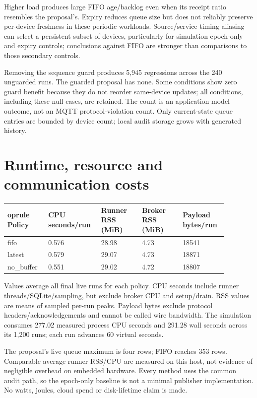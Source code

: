 \documentclass[11pt,a4paper]{article}
\begin{document}
Higher load produces large FIFO age/backlog even when its receipt ratio resembles the proposal's. Expiry reduces queue size but does not reliably preserve per-device freshness in these periodic workloads. Source/service timing aliasing can select a persistent subset of devices, particularly for simulation epoch-only and expiry controls; conclusions against FIFO are stronger than comparisons to those secondary controls.


Removing the sequence guard produces 5,945 regressions across the 240 unguarded runs. The guarded proposal has none. Some conditions show zero guard benefit because they do not reorder same-device updates; all conditions, including these null cases, are retained. The count is an application-model outcome, not an MQTT protocol-violation count. Only current-state queue entries are bounded by device count; local audit storage grows with generated history.


\section{Runtime, resource and communication costs}

\begingroup\small\setlength{\tabcolsep}{3pt}\begin{longtable}{p{0.176\linewidth}p{0.176\linewidth}p{0.176\linewidth}p{0.176\linewidth}p{0.176\linewidth}}	oprule
Policy & CPU seconds/run & Runner RSS (MiB) & Broker RSS (MiB) & Payload bytes/run \\
\midrule\endhead
fifo & 0.576 & 28.98 & 4.73 & 18541 \\
latest & 0.579 & 29.07 & 4.73 & 18871 \\
no\_buffer & 0.551 & 29.02 & 4.72 & 18807 \\
\bottomrule\end{longtable}\endgroup

Values average all final live runs for each policy. CPU seconds include runner threads/SQLite/sampling, but exclude broker CPU and setup/drain. RSS values are means of sampled per-run peaks. Payload bytes exclude protocol headers/acknowledgements and cannot be called wire bandwidth. The simulation consumes 277.02 measured process CPU seconds and 291.28 wall seconds across its 1,200 runs; each run advances 60 virtual seconds.


The proposal's live queue maximum is four rows; FIFO reaches 353 rows. Comparable average runner RSS/CPU are measured on this host, not evidence of negligible overhead on embedded hardware. Every method uses the common audit path, so the epoch-only baseline is not a minimal publisher implementation. No watts, joules, cloud spend or disk-lifetime claim is made.
\end{document}
